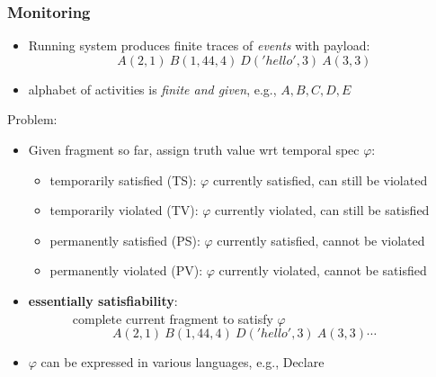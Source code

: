 \documentclass{beamer}
\begin{document}
\begin{frame}
\frametitle{Monitoring}

\begin{itemize}
	\item Running system produces finite traces of \emph{events} with payload: 
	$$A(2,1)~B(1,44,4)~D('hello',3)~A(3,3)$$ 
	
	\item alphabet of activities is \emph{finite and given}, e.g., $A,B,C,D,E$
\end{itemize}

Problem:
\begin{itemize}
	\item Given fragment so far, assign truth value wrt temporal spec $\varphi$:
		\begin{itemize}
			\item temporarily satisfied (TS): $\varphi$ currently satisfied, can still be violated
			\item temporarily violated (TV): $\varphi$ currently violated, can still be satisfied
			\item permanently satisfied (PS): $\varphi$ currently satisfied, cannot be violated
			\item permanently violated (PV): $\varphi$ currently violated, cannot be satisfied
		\end{itemize}	
		
	\item  {\bf essentially satisfiability}:\\ 
	~~~~~~~complete current fragment to satisfy $\varphi$
		$$A(2,1)~B(1,44,4)~D('hello',3)~A(3,3)\cdots$$ 

	\item $\varphi$ can be expressed in various languages, e.g., Declare
\end{itemize}

\end{frame}

\end{document}

